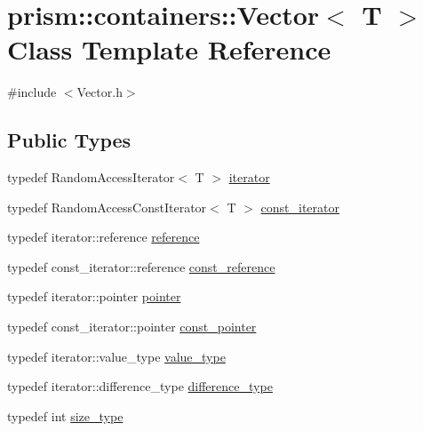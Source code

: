 \hypertarget{classprism_1_1containers_1_1_vector}{}\section{prism\+:\+:containers\+:\+:Vector$<$ T $>$ Class Template Reference}
\label{classprism_1_1containers_1_1_vector}


{\ttfamily \#include $<$Vector.\+h$>$}

\subsection*{Public Types}
\begin{DoxyCompactItemize}
\item 
typedef Random\+Access\+Iterator$<$ T $>$ \hyperlink{classprism_1_1containers_1_1_vector_a00f2237bf0922d6299f1004c0a717fd5}{iterator}
\item 
typedef Random\+Access\+Const\+Iterator$<$ T $>$ \hyperlink{classprism_1_1containers_1_1_vector_ab972cb3df6df07d9806f8750a948ec9d}{const\+\_\+iterator}
\item 
typedef iterator\+::reference \hyperlink{classprism_1_1containers_1_1_vector_a557fd3cca76315ccd4112d8b7398e43c}{reference}
\item 
typedef const\+\_\+iterator\+::reference \hyperlink{classprism_1_1containers_1_1_vector_a9950012c32498b47e38c98f2ce9fe048}{const\+\_\+reference}
\item 
typedef iterator\+::pointer \hyperlink{classprism_1_1containers_1_1_vector_a7205d98d3099bffc475e77acf7c8e2a1}{pointer}
\item 
typedef const\+\_\+iterator\+::pointer \hyperlink{classprism_1_1containers_1_1_vector_a1a5e05e74505807405e07550f8c1c5ad}{const\+\_\+pointer}
\item 
typedef iterator\+::value\+\_\+type \hyperlink{classprism_1_1containers_1_1_vector_a81b3c7a63deb9dedb3b3dd84977c6cca}{value\+\_\+type}
\item 
typedef iterator\+::difference\+\_\+type \hyperlink{classprism_1_1containers_1_1_vector_af003b53eb746fe1f294136b6d3384b18}{difference\+\_\+type}
\item 
typedef int \hyperlink{classprism_1_1containers_1_1_vector_ad8f479032fe710d3bdf041929ee6f123}{size\+\_\+type}
\end{DoxyCompactItemize}
